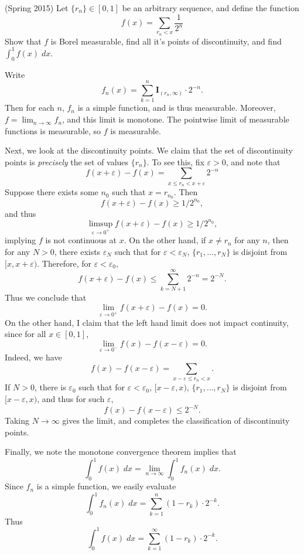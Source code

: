 \documentclass{exam}
\theoremstyle{problemstyle}
\newcommand{\1}[1]{\textbf{1}_{\left[#1\right]}} %
\begin{document}
\begin{questions}
\question (Spring 2015)
    Let $\{ r_n \} \in [0,1]$ be an arbitrary sequence, and define the function
    \[ f(x) = \sum_{r_n < x} \frac{1}{2^n} \]
    Show that $f$ is Borel measurable, find all it's points of discontinuity, and find $\int_0^1 f(x)\; dx$.
\begin{solution}
    Write
    \[ f_n(x) = \sum_{k = 1}^n \mathbf{I}_{(r_n, \infty)} \cdot 2^{-n}. \]
    Then for each $n$, $f_n$ is a simple function, and is thus measurable. Moreover, $f = \lim_{n \to \infty} f_n$, and this limit is monotone. The pointwise limit of measurable functions is measurable, so $f$ is measurable.
    
    Next, we look at the discontinuity points. We claim that the set of discontinuity points is \emph{precisely} the set of values $\{ r_n \}$. To see this, fix $\varepsilon > 0$, and note that
    \[ f(x + \varepsilon) - f(x) = \sum_{x \leq r_n < x + \varepsilon} 2^{-n} \]
    Suppose there exists some $n_0$ such that $x = r_{n_0}$. Then
    \[ f(x + \varepsilon) - f(x) \geq 1/2^{n_0}, \]
    and thus
    \[ \limsup_{\varepsilon \to 0^+} f(x + \varepsilon) - f(x) \geq 1/2^{n_0}, \]
    implying $f$ is not continuous at $x$. On the other hand, if $x \neq r_n$ for any $n$, then for any $N > 0$, there exists $\varepsilon_N$ such that for $\varepsilon < \varepsilon_N$, $\{ r_1, \dots, r_N \}$ is disjoint from $[x,x+\varepsilon)$. Therefore, for $\varepsilon < \varepsilon_0$,
    \[ f(x + \varepsilon) - f(x) \leq \sum_{k = N+1}^\infty 2^{-n} = 2^{-N}. \]
    Thus we conclude that
    \[ \lim_{\varepsilon \to 0^+} f(x + \varepsilon) - f(x) = 0. \]
    On the other hand, I claim that the left hand limit does not impact continuity, since for all $x \in [0,1]$,
    \[ \lim_{\varepsilon \to 0^-} f(x) - f(x-\varepsilon) = 0. \]
    Indeed, we have
    \[ f(x) - f(x-\varepsilon) = \sum_{x - \varepsilon \leq r_n < x}. \]
    If $N > 0$, there is $\varepsilon_0$ such that for $\varepsilon < \varepsilon_0$, $[x-\varepsilon,x)$, $\{ r_1, \dots, r_N \}$ is disjoint from $[x-\varepsilon,x)$, and thus for such $\varepsilon$,
    \[ f(x) - f(x-\varepsilon) \leq 2^{-N}. \]
    Taking $N \to \infty$ gives the limit, and completes the classification of discontinuity points.
    
    Finally, we note the monotone convergence theorem implies that
    \[ \int_0^1 f(x)\; dx = \lim_{n \to \infty} \int_0^1 f_n(x)\; dx. \]
    Since $f_n$ is a simple function, we easily evaluate
    \[ \int_0^1 f_n(x)\; dx = \sum_{k = 1}^n (1 - r_k) \cdot 2^{-k}. \]
    Thus
    \[ \int_0^1 f(x)\; dx = \sum_{k = 1}^\infty (1 - r_k) \cdot 2^{-k}. \]
\end{solution}



\end{questions}
\end{document}
